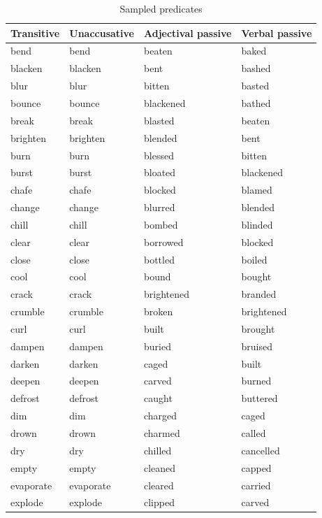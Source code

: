 \documentclass[output=paper]{langsci/langscibook}
\begin{document}
\begin{paperappendix}
\begin{table}[H]
{\smaller
\caption{Sampled predicates}
\begin{tabularx}{\textwidth}{XXXX}
\lsptoprule
Transitive  & Unaccusative & Adjectival passive & Verbal passive\\
\midrule%
bend      & bend      & beaten     & baked\\
blacken   & blacken   & bent       & bashed\\
blur      & blur      & bitten     & basted\\
bounce    & bounce    & blackened  & bathed\\
break     & break     & blasted    & beaten\\
brighten  & brighten  & blended    & bent\\
burn      & burn      & blessed    & bitten \\
burst     & burst     & bloated    & blackened\\
chafe     & chafe     & blocked    & blamed\\
change    & change    & blurred    & blended\\
chill     & chill     & bombed     & blinded\\
clear     & clear     & borrowed   & blocked\\
close     & close     & bottled    & boiled\\
cool      & cool      & bound      & bought\\
crack     & crack     & brightened & branded\\
crumble   & crumble   & broken     & brightened\\
curl      & curl      & built      & brought\\
dampen    & dampen    & buried     & bruised\\
darken    & darken    & caged      & built \\
deepen    & deepen    & carved     & burned\\
defrost   & defrost   & caught     & buttered\\
dim       & dim       & charged    & caged\\
drown     & drown     & charmed    & called\\
dry       & dry       & chilled    & cancelled \\
empty     & empty     & cleaned    & capped\\
evaporate & evaporate & cleared    & carried\\
explode   & explode   & clipped    & carved\\

\end{tabularx}}
\end{table}
\end{paperappendix}
\end{document}
